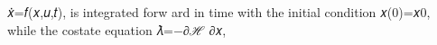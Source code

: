 𝑥̇=𝑓(𝑥,𝑢,𝑡),
is integrated forw ard in time with the initial condition  𝑥(0)=𝑥0, while the costate equation
𝜆̇=−∂ℋ
∂𝑥,